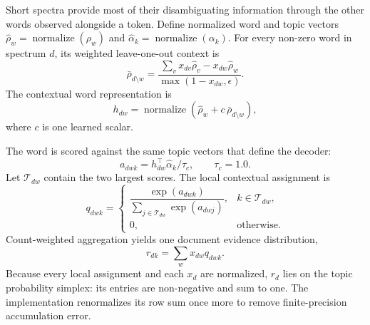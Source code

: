 \documentclass[10pt,a4paper]{article}
\newcommand{\normalize}{\operatorname{normalize}}
\begin{document}
Short spectra provide most of their disambiguating information through the
other words observed alongside a token. Define normalized word and topic
vectors $\widehat\rho_w=\normalize(\rho_w)$ and
$\widehat\alpha_k=\normalize(\alpha_k)$. For every non-zero word in spectrum
$d$, its weighted leave-one-out context is
\begin{equation}
  \bar\rho_{d\setminus w}=
  \frac{\sum_v x_{dv}\widehat\rho_v-x_{dw}\widehat\rho_w}
       {\max(1-x_{dw},\epsilon)}.
  \label{eq:loo-context}
\end{equation}
The contextual word representation is
\begin{equation}
  h_{dw}=\normalize\!\left(
  \widehat\rho_w+c\,\bar\rho_{d\setminus w}\right),
  \label{eq:contextual-word}
\end{equation}
where $c$ is one learned scalar.

The word is scored against the same topic vectors that define the decoder:
\begin{equation}
  a_{dwk}=h_{dw}^{\top}\widehat\alpha_k/\tau_c,
  \qquad \tau_c=1.0.
  \label{eq:context-score}
\end{equation}
Let $\mathcal T_{dw}$ contain the two largest scores. The local contextual
assignment is
\begin{equation}
  q_{dwk}=
  \begin{cases}
    \dfrac{\exp(a_{dwk})}
    {\sum_{j\in\mathcal T_{dw}}\exp(a_{dwj})},
    & k\in\mathcal T_{dw},\\[8pt]
    0, & \text{otherwise}.
  \end{cases}
  \label{eq:top2-assignment}
\end{equation}
Count-weighted aggregation yields one document evidence distribution,
\begin{equation}
  r_{dk}=\sum_w x_{dw}q_{dwk}.
  \label{eq:document-evidence}
\end{equation}
Because every local assignment and each $x_d$ are normalized, $r_d$ lies on the
topic probability simplex: its entries are non-negative and sum to one. The
implementation renormalizes its row sum once more to remove finite-precision
accumulation error.
\end{document}
